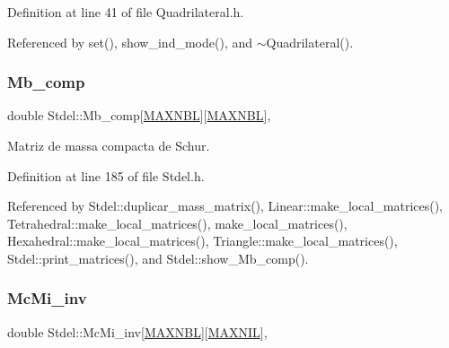 Definition at line 41 of file Quadrilateral.\+h.



Referenced by set(), show\+\_\+ind\+\_\+mode(), and $\sim$\+Quadrilateral().

\mbox{\label{classStdel_aa1627cb39fa5da75764809412159c825}} 
\subsubsection{\texorpdfstring{Mb\+\_\+comp}{Mb\_comp}}
{\footnotesize\ttfamily double Stdel\+::\+Mb\+\_\+comp\mbox{[}\hyperlink{MyOptions_8h_aed8828a63ec0a2a0461b7c9ed39dd648}{M\+A\+X\+N\+BL}\mbox{]}\mbox{[}\hyperlink{MyOptions_8h_aed8828a63ec0a2a0461b7c9ed39dd648}{M\+A\+X\+N\+BL}\mbox{]}\hspace{0.3cm}{\ttfamily [protected]}, {\ttfamily [inherited]}}



Matriz de massa compacta de Schur. 



Definition at line 185 of file Stdel.\+h.



Referenced by Stdel\+::duplicar\+\_\+mass\+\_\+matrix(), Linear\+::make\+\_\+local\+\_\+matrices(), Tetrahedral\+::make\+\_\+local\+\_\+matrices(), make\+\_\+local\+\_\+matrices(), Hexahedral\+::make\+\_\+local\+\_\+matrices(), Triangle\+::make\+\_\+local\+\_\+matrices(), Stdel\+::print\+\_\+matrices(), and Stdel\+::show\+\_\+\+Mb\+\_\+comp().

\mbox{\label{classStdel_acc685141e80bcce9703e37f32cc5c42c}} 
\subsubsection{\texorpdfstring{Mc\+Mi\+\_\+inv}{McMi\_inv}}
{\footnotesize\ttfamily double Stdel\+::\+Mc\+Mi\+\_\+inv\mbox{[}\hyperlink{MyOptions_8h_aed8828a63ec0a2a0461b7c9ed39dd648}{M\+A\+X\+N\+BL}\mbox{]}\mbox{[}\hyperlink{MyOptions_8h_a463cdf068fb6289d1f81dac7e0f76ab5}{M\+A\+X\+N\+IL}\mbox{]}\hspace{0.3cm}{\ttfamily [protected]}, {\ttfamily [inherited]}}



